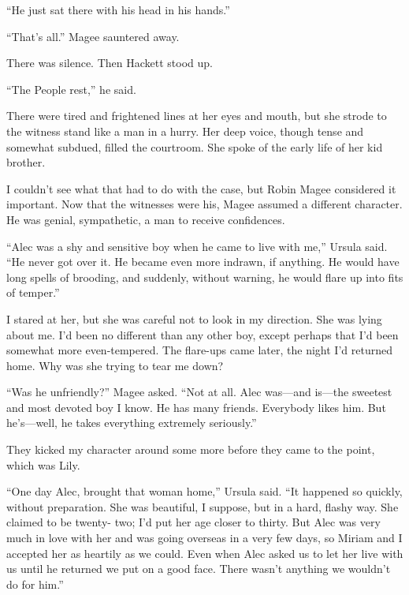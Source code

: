 \documentclass{novel}
\begin{document}
“He just sat there with his head in his hands.”

“That’s all.” Magee sauntered away. 

There was silence. Then Hackett stood up.

“The People rest,” he said.

\vspace{2\nbs}
\clearpage
\thispagestyle{empty}
\begin{ChapterStart}
\vspace{3\nbs}
\end{ChapterStart}

There were tired and frightened lines at her eyes and mouth, but she strode to the witness stand like a man in a hurry. Her deep voice, though tense and somewhat subdued, filled the courtroom. She spoke of the early life of her kid brother.

I couldn’t see what that had to do with the case, but Robin Magee considered it important. Now that the witnesses were his, Magee assumed a different character. He was genial, sympathetic, a man to receive confidences.

“Alec was a shy and sensitive boy when he came to live with me,” Ursula said. “He never got over it. He became even more indrawn, if anything. He would have long spells of brooding, and suddenly, without warning, he would flare up into fits of temper.”

I stared at her, but she was careful not to look in my direction. She was lying about me. I’d been no different than any other boy, except perhaps that I’d been somewhat more even-tempered. The flare-ups came later, the night I’d returned home. Why was she trying to tear me down?

“Was he unfriendly?” Magee asked. “Not at all. Alec was—and is—the sweetest and most devoted boy I know. He has many friends. Everybody likes him. But he’s—well, he takes everything extremely seriously.”

They kicked my character around some more before they came to the point, which was Lily.

“One day Alec, brought that woman home,” Ursula said. “It happened so quickly, without preparation. She was beautiful, I suppose, but in a hard, flashy way. She claimed to be twenty- two; I’d put her age closer to thirty. But Alec was very much in love with her and was going overseas in a very few days, so Miriam and I accepted her as heartily as we could. Even when Alec asked us to let her live with us until he returned we put on a good face. There wasn’t anything we wouldn’t do for him.”
\end{document}
